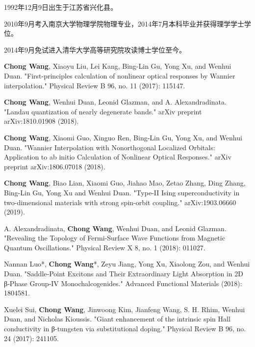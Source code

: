 \begin{resume}


  1992年12月9日出生于江苏省兴化县。

  2010年9月考入南京大学物理学院物理专业，2014年7月本科毕业并获得理学学士学位。

  2014年9月免试进入清华大学高等研究院攻读博士学位至今。


  \begin{publications}
    \item \textbf{Chong Wang}, Xiaoyu Liu, Lei Kang, Bing-Lin Gu, Yong Xu, and Wenhui Duan. "First-principles calculation of nonlinear optical responses by Wannier interpolation." Physical Review B 96, no. 11 (2017): 115147.

    \item \textbf{Chong Wang}, Wenhui Duan, Leonid Glazman, and A. Alexandradinata. "Landau quantization of nearly degenerate bands." arXiv preprint arXiv:1810.01908 (2018).

    \item \textbf{Chong Wang}, Xiaomi Guo, Xinguo Ren, Bing-Lin Gu, Yong Xu, and Wenhui Duan. "Wannier Interpolation with Nonorthogonal Localized Orbitals: Application to ab initio Calculation of Nonlinear Optical Responses." arXiv preprint arXiv:1806.07018 (2018).

    \item \textbf{Chong Wang}, Biao Lian, Xiaomi Guo, Jiahao Mao, Zetao Zhang, Ding Zhang, Bing-Lin Gu, Yong Xu and Wenhui Duan. "Type-II Ising superconductivity in two-dimensional materials with strong spin-orbit coupling." arXiv:1903.06660 (2019).
 
    \item A. Alexandradinata, \textbf{Chong Wang}, Wenhui Duan, and Leonid Glazman. "Revealing the Topology of Fermi-Surface Wave Functions from Magnetic Quantum Oscillations." Physical Review X 8, no. 1 (2018): 011027.

    \item Nannan Luo*, \textbf{Chong Wang}*, Zeyu Jiang, Yong Xu, Xiaolong Zou, and Wenhui Duan. "Saddle‐Point Excitons and Their Extraordinary Light Absorption in 2D β‐Phase Group‐IV Monochalcogenides." Advanced Functional Materials (2018): 1804581.
    
    \item Xuelei Sui, \textbf{Chong Wang}, Jinwoong Kim, Jianfeng Wang, S. H. Rhim, Wenhui Duan, and Nicholas Kioussis. "Giant enhancement of the intrinsic spin Hall conductivity in β-tungsten via substitutional doping." Physical Review B 96, no. 24 (2017): 241105.
    

\end{publications}
\end{resume}
